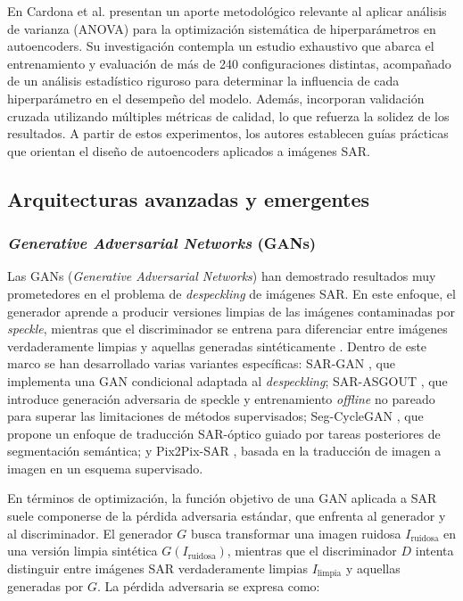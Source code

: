 En Cardona et al. \cite{cardona2025optimization} presentan un aporte metodológico relevante al aplicar análisis de varianza (ANOVA) para la optimización sistemática de hiperparámetros en autoencoders. Su investigación contempla un estudio exhaustivo que abarca el entrenamiento y evaluación de más de 240 configuraciones distintas, acompañado de un análisis estadístico riguroso para determinar la influencia de cada hiperparámetro en el desempeño del modelo. Además, incorporan validación cruzada utilizando múltiples métricas de calidad, lo que refuerza la solidez de los resultados. A partir de estos experimentos, los autores establecen guías prácticas que orientan el diseño de autoencoders aplicados a imágenes SAR.

\subsection{Arquitecturas avanzadas y emergentes}

\subsubsection{\emph{Generative Adversarial Networks} (GANs)}

Las GANs (\emph{Generative Adversarial Networks}) han demostrado resultados muy prometedores en el problema de \emph{despeckling} de imágenes SAR. En este enfoque, el generador aprende a producir versiones limpias de las imágenes contaminadas por \emph{speckle}, mientras que el discriminador se entrena para diferenciar entre imágenes verdaderamente limpias y aquellas generadas sintéticamente \cite{saha2024sar}. Dentro de este marco se han desarrollado varias variantes específicas: SAR-GAN \cite{gu2019gan}, que implementa una GAN condicional adaptada al \emph{despeckling}; SAR-ASGOUT \cite{wang2025sar}, que introduce generación adversaria de speckle y entrenamiento \emph{offline} no pareado para superar las limitaciones de métodos supervisados; Seg-CycleGAN \cite{zhang2025seg}, que propone un enfoque de traducción SAR-óptico guiado por tareas posteriores de segmentación semántica; y Pix2Pix-SAR \cite{isola2017image}, basada en la traducción de imagen a imagen en un esquema supervisado.

En términos de optimización, la función objetivo de una GAN aplicada a SAR suele componerse de la pérdida adversaria estándar, que enfrenta al generador y al discriminador. El generador $G$ busca transformar una imagen ruidosa $I_{\text{ruidosa}}$ en una versión limpia sintética $G(I_{\text{ruidosa}})$, mientras que el discriminador $D$ intenta distinguir entre imágenes SAR verdaderamente limpias $I_{\text{limpia}}$ y aquellas generadas por $G$. La pérdida adversaria se expresa como:

